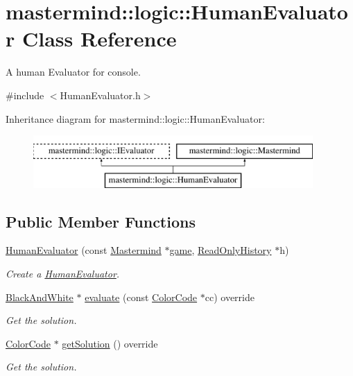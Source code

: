 \hypertarget{classmastermind_1_1logic_1_1_human_evaluator}{}\section{mastermind\+:\+:logic\+:\+:Human\+Evaluator Class Reference}
\label{classmastermind_1_1logic_1_1_human_evaluator}


A human Evaluator for console.  




{\ttfamily \#include $<$Human\+Evaluator.\+h$>$}

Inheritance diagram for mastermind\+:\+:logic\+:\+:Human\+Evaluator\+:\begin{figure}[H]
\begin{center}
\leavevmode
\includegraphics[height=2.000000cm]{classmastermind_1_1logic_1_1_human_evaluator}
\end{center}
\end{figure}
\subsection*{Public Member Functions}
\begin{DoxyCompactItemize}
\item 
\hyperlink{classmastermind_1_1logic_1_1_human_evaluator_a1079556bd0f849489b63c1aba45bfac9}{Human\+Evaluator} (const \hyperlink{classmastermind_1_1logic_1_1_mastermind}{Mastermind} $\ast$\hyperlink{classmastermind_1_1logic_1_1_human_evaluator_afae62228bcb3dafc7b04be93231620d7}{game}, \hyperlink{classmastermind_1_1logic_1_1_read_only_history}{Read\+Only\+History} $\ast$h)
\begin{DoxyCompactList}\small\item\em Create a \hyperlink{classmastermind_1_1logic_1_1_human_evaluator}{Human\+Evaluator}. \end{DoxyCompactList}\item 
\hyperlink{classmastermind_1_1logic_1_1_black_and_white}{Black\+And\+White} $\ast$ \hyperlink{classmastermind_1_1logic_1_1_human_evaluator_a12080bafb5e428db8cf8b8173821f83d}{evaluate} (const \hyperlink{classmastermind_1_1logic_1_1_color_code}{Color\+Code} $\ast$cc) override
\begin{DoxyCompactList}\small\item\em Get the solution. \end{DoxyCompactList}\item 
\hyperlink{classmastermind_1_1logic_1_1_color_code}{Color\+Code} $\ast$ \hyperlink{classmastermind_1_1logic_1_1_human_evaluator_ab369895151e4702e8b57d74c8f6869db}{get\+Solution} () override
\begin{DoxyCompactList}\small\item\em Get the solution. \end{DoxyCompactList}\end{DoxyCompactItemize}
